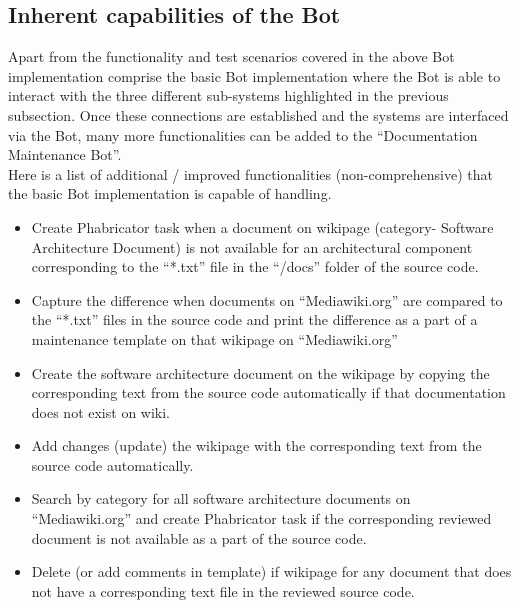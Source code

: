 \subsection{Inherent capabilities of the Bot }
\indent Apart from the functionality and test scenarios covered in the above Bot implementation comprise the basic Bot implementation where the Bot is able to interact with the three different sub-systems highlighted in the previous subsection. Once these connections are established and the systems are interfaced via the Bot, many more functionalities can be added to the \enquote{Documentation Maintenance Bot}.
\\\indent Here is a list of additional / improved functionalities (non-comprehensive) that the basic Bot implementation is capable of handling.
\begin{itemize}
\item Create Phabricator task when a document on wikipage (category- Software Architecture Document) is not available for an architectural component corresponding to the \enquote{*.txt} file in the \enquote{/docs} folder of the source code.
\item Capture the difference when documents on \enquote{Mediawiki.org} are compared to the \enquote{*.txt} files in the source code and print the difference as a part of a maintenance template on that wikipage on \enquote{Mediawiki.org}
\item Create the software architecture document on the wikipage by copying the corresponding text from the source code automatically if that documentation does not exist on wiki.
\item Add changes (update) the wikipage with the corresponding text from the source code automatically.
\item Search by category for all software architecture documents on \enquote{Mediawiki.org} and create Phabricator task if the corresponding reviewed document is not available as a part of the source code.
\item Delete (or add comments in template) if wikipage for any document that does not have a corresponding text file in the reviewed source code.
\end{itemize}

